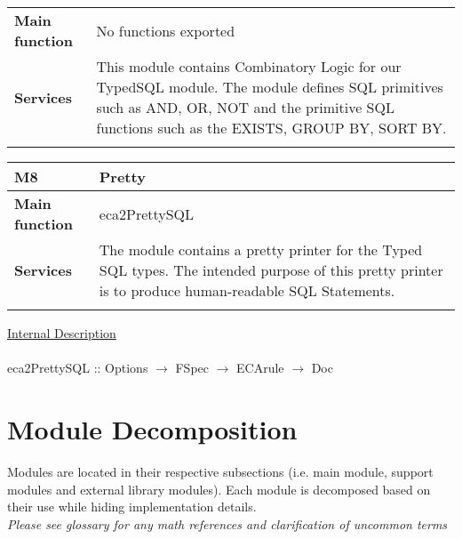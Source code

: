 \documentclass[12pt, svgnames]{article}
\begin{document}
{{{{{{{\begin{tabularx}{\textwidth}{>{\bfseries}m{5cm}X}
        Main function  & No functions exported
        \\	Services &  This module contains Combinatory Logic for our TypedSQL module. The module defines SQL primitives such as AND, OR, NOT and the primitive SQL functions such as the EXISTS, GROUP BY, SORT BY.
        \\       
        \vspace{12pt}
    \end{tabularx}\vspace{3em}
    {\setlength{\tabcolsep}{6pt} 
        \begin{tabularx}{\textwidth}{>{\bfseries}m{5cm}X}
            M8 & Pretty \\ 
            \midrule
            
            Main function  & eca2PrettySQL
            \\	Services &  The module contains a pretty printer for the Typed SQL types. The intended purpose of this pretty printer is to produce human-readable SQL Statements.
            \\       
            \vspace{12pt}
        \end{tabularx}\vspace{3em}
\underline{Internal Description}\\ \\
eca2PrettySQL :: Options $\rightarrow$ FSpec $\rightarrow$ ECArule $\rightarrow$ Doc

\section{Module Decomposition} \label{SecMD}
Modules are located in their respective subsections (i.e. main module, support 
modules and external library modules). Each module is decomposed based on their 
use while hiding implementation details. 
\\ \newline
\textit{Please see glossary for any math references and clarification of 
uncommon terms}

        
}}}}}}}}
\end{document}
